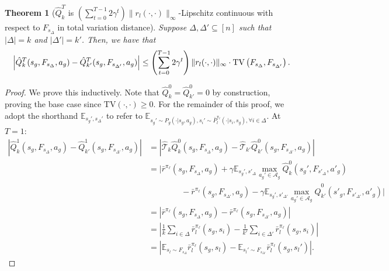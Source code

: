 \documentclass{article}
\theoremstyle{plain}
\newtheorem{theorem}{Theorem}[section]
\theoremstyle{definition}
\def\E{\mathbb{E}}
\begin{document}
\begin{theorem}[$\hat{Q}_k^T$ is $(\sum_{t=0}^{T-1} 2\gamma^t)\|r_l(\cdot,\cdot)\|_\infty$-Lipschitz continuous with respect to $F_{s_\Delta}$ in total variation distance]\label{lemma: Q lipschitz continuous wrt Fsdelta}
Suppose $\Delta,\Delta'\subseteq[n]$ such that $|\Delta|=k$ and $|\Delta'|=k'$. Then, we have that
\begin{equation}\left|\hat{Q}^T_k(s_g,F_{s_\Delta},a_g) - \hat{Q}^T_{k'}(s_g, F_{s_{\Delta'}}, a_g)\right| \leq \left(\sum_{t=0}^{T-1} 2\gamma^t\right)\|r_l(\cdot,\cdot)\|_\infty \cdot \mathrm{TV}\left(F_{s_\Delta}, F_{s_{\Delta'}}\right).\\ \end{equation}
\end{theorem}
\begin{proof} 
We prove this inductively. Note that  $\hat{Q}_k^0 = \hat{Q}_{k'}^0 =0$ by construction, proving the base case since $\mathrm{TV}(\cdot,\cdot)\geq 0$. For the remainder of this proof, we adopt the shorthand $\E_{s_g',s_\Delta'}$ to refer to $\E_{s_g'\sim P_g(\cdot|s_g, a_g), s_i'\sim \bar{P}^{\pi_\ell}_l(\cdot|s_i,s_g),\forall i\in\Delta}$. At $T=1$:
\begin{align*}
|\hat{Q}_k^1(s_g,F_{s_\Delta},a_g)-\hat{Q}_{k'}^1(s_g, F_{s_{\Delta'}}, a_g)| &= \left|\hat{\mathcal{T}}_k\hat{Q}_k^0(s_g,F_{s_\Delta},a_g)-\hat{\mathcal{T}}_{k'}\hat{Q}_{k'}^0(s_g, F_{s_{\Delta'}}, a_g)\right| \\
&= |\bar{r}^{\pi_\ell}(s_g, F_{s_\Delta}, a_g)+\gamma \E_{s_g', s'_\Delta}\max_{a_g'\in\mathcal{A}_g} \hat{Q}_k^0(s_g',F_{s'_\Delta},a'_g) \\
&\quad\quad\quad\quad - \bar{r}^{\pi_\ell}(s_g,F_{s_{\Delta'}},a_g) -\gamma \E_{s_g', s'_{\Delta'}} \max_{a_g'\in\mathcal{A}_g}\hat{Q}_{k'}^0(s'_g, F_{s'_{\Delta'}}, a'_g)| \\
&= |\bar{r}^{\pi_\ell}(s_g, F_{s_\Delta}, a_g)-\bar{r}^{\pi_\ell}(s_g, F_{s_{\Delta'}},a_g)| \\
&= \left|\frac{1}{k}\sum_{i\in\Delta}\bar{r}^{\pi_\ell}_l(s_g,s_i) -\frac{1}{k'}\sum_{i\in\Delta'}\bar{r}^{\pi_\ell}_l(s_g,s_i)\right| \\
&= |\E_{s_l \sim F_{s_\Delta}}\bar{r}^{\pi_\ell}_l(s_g, s_l) - \E_{s_l' \sim F_{s_{\Delta'}}}\bar{r}^{\pi_\ell}_l(s_g, s_l')|.
\end{align*}


\end{proof}
\end{document}
